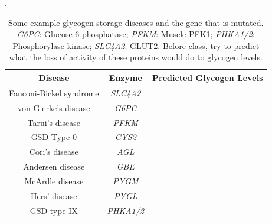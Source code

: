 \documentclass{tufte-handout}
\begin{document}
\begin{table}
\centering
\caption{Some example glycogen storage diseases and the gene that is mutated.  \textit{G6PC}: Glucose-6-phosphatase; \textit{PFKM}: Muscle PFK1; \textit{PHKA1/2}: Phosphorylase kinase; \textit{SLC4A2}: GLUT2.  Before class, try to predict what the loss of activity of these proteins would do to glycogen levels.}.
\label{tab:glycogen-storage-diseases}
\begin{tabular}{ccc}
\hline
\textbf {Disease} & \textbf{Enzyme} & \textbf{Predicted Glycogen Levels} \\
\hline
Fanconi-Bickel syndrome & \textit{SLC4A2} & \\
von Gierke's disease & \textit{G6PC} & \\
Tarui's disease & \textit{PFKM} & \\
GSD Type 0 & \textit{GYS2} & \\
Cori's disease & \textit{AGL} & \\
Andersen disease & \textit{GBE} & \\
McArdle disease& \textit{PYGM} & \\
Hers' disease & \textit{PYGL} & \\
GSD type IX & \textit{PHKA1/2} & \\
\hline
\end{tabular}
\end{table}




\end{document}
